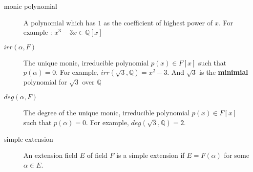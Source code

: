 \begin{description}
	\item[monic polynomial] A polynomial which has $1$ as the coefficient of highest power of $x$.
		For example : $x^3 - 3x \in \mathbb{Q}[x]$
	\item[$irr(\alpha,F)$] The unique monic, irreducible polynomial $p(x) \in F[x]$ such that $p(\alpha) = 0$.
		For example, $irr(\sqrt{3},\mathbb{Q}) = x^2-3$.
		And $\sqrt{3}$ is the \textbf{minimial} polynomial for $\sqrt{3}$ over $\mathbb{Q}$
	\item[$deg(\alpha,F)$] The degree of the unique monic, irreducible polynomial $p(x) \in F[x]$ such that $p(\alpha) = 0$.
		For example, $deg(\sqrt{3},\mathbb{Q}) = 2$.
	\item[simple extension] An extension field $E$ of field $F$ is a simple extension if $E = F(\alpha)$ for some $\alpha \in E$.
\end{description}

